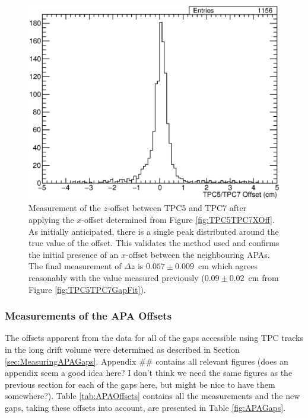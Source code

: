 \begin{figure}
  \centering
  \includegraphics[width=12cm]{TPC5TPC7ZOff.eps}
  \caption{Measurement of the $z$-offset between TPC5 and TPC7 after applying the $x$-offset determined from Figure \ref{fig:TPC5TPC7XOff}.  As initially anticipated, there is a single peak distributed around the true value of the offset.  This validates the method used and confirms the initial presence of an $x$-offset between the neighbouring APAs.  The final measurement of $\Delta z$ is $0.057\pm0.009$~cm which agrees reasonably with the value measured previously ($0.09\pm0.02$~cm from Figure \ref{fig:TPC5TPC7GapFit}).}
  \label{fig:TPC5TPC7ZOff}
\end{figure}

\subsubsection{Measurements of the APA Offsets}\label{sec:APAOffsetMeasurements}

The offsets apparent from the data for all of the gaps accessible using TPC tracks in the long drift volume were determined as described in Section \ref{sec:MeasuringAPAGaps}.  Appendix \#\# contains all relevant figures (does an appendix seem a good idea here? I don't think we need the same figures as the previous section for each of the gaps here, but might be nice to have them somewhere?).  Table \ref{tab:APAOffsets} contains all the measurements and the new gaps, taking these offsets into account, are presented in Table \ref{fig:APAGaps}.

